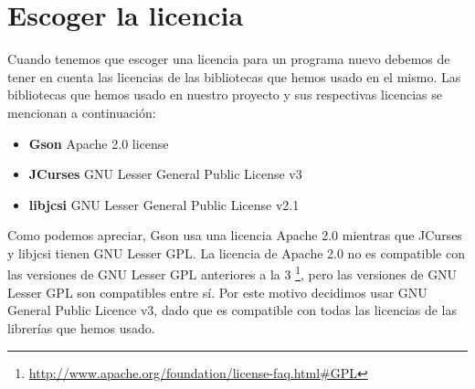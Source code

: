 \chapter{Escoger la licencia}

Cuando tenemos que escoger una licencia para un programa nuevo debemos de tener en cuenta las licencias de las bibliotecas que hemos usado en el mismo. Las bibliotecas que hemos usado en nuestro proyecto y sus respectivas licencias se mencionan a continuación:

\begin{itemize}
  \item \textbf{Gson} Apache 2.0 license
  \item \textbf{JCurses} GNU Lesser General Public License v3
  \item \textbf{libjcsi} GNU Lesser General Public License v2.1
\end{itemize}

Como podemos apreciar, Gson usa una licencia Apache 2.0 mientras que JCurses y libjcsi tienen GNU Lesser GPL.
La licencia de Apache 2.0 no es compatible con las versiones de GNU Lesser GPL anteriores a la 3 \footnote{\url{http://www.apache.org/foundation/license-faq.html\#GPL}}, pero las versiones de GNU Lesser GPL son compatibles entre sí.
Por este motivo decidimos usar GNU General Public Licence v3, dado que es compatible con todas las licencias de las librerías que hemos usado.

